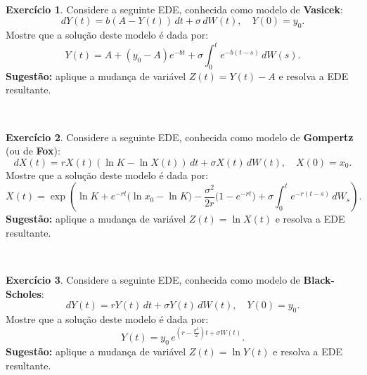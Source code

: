 \documentclass[
  11pt,
  a4paper,
]{book}
\theoremstyle{definition}
\theoremstyle{definition}
\theoremstyle{definition}
\newtheorem{exercise}{Exercício}[chapter]
\theoremstyle{definition}
\theoremstyle{remark}
\begin{document}
\(\,\)

\begin{exercise}
Considere a seguinte EDE, conhecida como modelo de \textbf{Vasicek}:
\[
dY(t)=b(A-Y(t))\,dt + \sigma\,dW(t), \quad Y(0)=y_0.
\]
Mostre que a solução deste modelo é dada por:
\[
Y(t) = A + (y_0 - A)e^{-bt} + \sigma \int_0^t e^{-b(t-s)}\,dW(s).
\]
\textbf{Sugestão:} aplique a mudança de variável \(Z(t) = Y(t) - A\) e resolva a EDE resultante.
\end{exercise}

\(\,\)

\begin{exercise}
Considere a seguinte EDE, conhecida como modelo de \textbf{Gompertz} (ou de \textbf{Fox}):
\[
dX(t)=rX(t)(\ln K - \ln X(t))\,dt + \sigma X(t)\,dW(t), \quad X(0)=x_0.
\]
Mostre que a solução deste modelo é dada por:
\[
X(t)=\exp\!\left(
   \ln K 
   + e^{-r t}\big(\ln x_0-\ln K\big) 
   - \frac{\sigma^2}{2r}\big(1-e^{-r t}\big) 
   + \sigma\int_0^t e^{-r (t-s)}\,dW_s
\right).
\]
\textbf{Sugestão:} aplique a mudança de variável \(Z(t)=\ln X(t)\) e resolva a EDE resultante.
\end{exercise}

\(\,\)

\begin{exercise}
Considere a seguinte EDE, conhecida como modelo de \textbf{Black-Scholes}:
\[
dY(t) = rY(t)\,dt + \sigma Y(t)\,dW(t), \quad Y(0)=y_0.
\]
Mostre que a solução deste modelo é dada por:
\[
Y(t) = y_0\, e^{\left(r - \frac{\sigma^2}{2}\right)t + \sigma W(t)}.
\]
\textbf{Sugestão:} aplique a mudança de variável \(Z(t) = \ln Y(t)\) e resolva a EDE resultante.
\end{exercise}

\(\,\)
\end{document}
